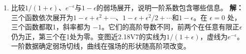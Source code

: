 \documentclass[UTF8,fontset=fandol,a4paper,11pt]{ctexart}
\begin{document}
\begin{enumerate}
\item 比较$1/(1+\epsilon)$、$e^{-\epsilon}$与$1-\epsilon$的弱场展开，说明一阶系数包含哪些信息。
\textbf{解：}三个函数依次展开为$1-\epsilon+\epsilon^2+\cdots$、$1-\epsilon+\epsilon^2/2+\cdots$和$1-\epsilon$。在 $\epsilon=0$ 处，三个函数都取1，斜率都为 $-1$。它们的高阶导数不同，前两个在任意有限正$\epsilon$仍为正，第三个在1处为零。变图近2.18V7的实线为$1/(1+\epsilon)$，虚线为$e^{-\epsilon}$。一阶数据确定弱场切线，曲线在强场的形状随高阶项改变。
\begin{center}\begin{minipage}{.98\linewidth}\centering
{}
\end{minipage}
\end{center}
\end{enumerate}
\end{document}
